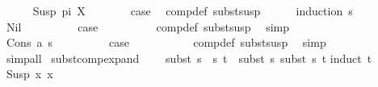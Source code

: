 \begin{isabellebody}
\ \ \ \ \isamarkupfalse%
\ {\isacharparenleft}{\kern0pt}Susp\ pi\ X{\isacharparenright}{\kern0pt}\isanewline
\ \ \ \ \isamarkupfalse%
\ \isamarkupfalse%
\ {\isacharquery}{\kern0pt}case\ \isamarkupfalse%
\ comp{\isacharunderscore}{\kern0pt}def\ subst{\isacharunderscore}{\kern0pt}susp\isanewline
\ \ \ \ \isamarkupfalse%
\ {\isacharparenleft}{\kern0pt}induction\ s{\isacharparenright}{\kern0pt}\isanewline
\ \ \ \ \ \ \isamarkupfalse%
\ Nil\isanewline
\ \ \ \ \ \ \isamarkupfalse%
\ \isamarkupfalse%
\ {\isacharquery}{\kern0pt}case\isanewline
\ \ \ \ \ \ \ \ \isamarkupfalse%
\ comp{\isacharunderscore}{\kern0pt}def\ subst{\isacharunderscore}{\kern0pt}susp\ \isamarkupfalse%
\ simp\isanewline
\ \ \ \ \isamarkupfalse%
\isanewline
\ \ \ \ \ \ \isamarkupfalse%
\ {\isacharparenleft}{\kern0pt}Cons\ a\ s{\isacharparenright}{\kern0pt}\isanewline
\ \ \ \ \ \ \isamarkupfalse%
\ \isamarkupfalse%
\ {\isacharquery}{\kern0pt}case\ \isanewline
\ \ \ \ \ \ \ \ \isamarkupfalse%
\ comp{\isacharunderscore}{\kern0pt}def\ subst{\isacharunderscore}{\kern0pt}susp\ \isamarkupfalse%
\ simp\isanewline
\ \ \ \ \isamarkupfalse%
\isanewline
\ \ \isamarkupfalse%
\ {\isacharparenleft}{\kern0pt}simp{\isacharunderscore}{\kern0pt}all{\isacharparenright}{\kern0pt}\isanewline
{}\isamarkupfalse%
%
\endisatagproof
{\isafoldproof}%
%
\isadelimproof
\isanewline
%
\endisadelimproof
\isanewline
{}\isamarkupfalse%
\ subst{\isacharunderscore}{\kern0pt}comp{\isacharunderscore}{\kern0pt}expand{\isacharcolon}{\kern0pt}\ \isanewline
\ \ \ {\isachardoublequoteopen}subst\ {\isacharparenleft}{\kern0pt}s{}\ {\isasymbullet}\ s{}{\isacharparenright}{\kern0pt}\ t\ {\isacharequal}{\kern0pt}\ subst\ s{}\ {\isacharparenleft}{\kern0pt}subst\ s{}\ t{\isacharparenright}{\kern0pt}{\isachardoublequoteclose}\isanewline
%
\isadelimproof
%
\endisadelimproof
%
\isatagproof
{}\isamarkupfalse%
{\isacharparenleft}{\kern0pt}induct\ t{\isacharparenright}{\kern0pt}\isanewline
\ \ \isamarkupfalse%
\ {\isacharparenleft}{\kern0pt}Susp\ x{}\ x{}{\isacharparenright}{\kern0pt}\isanewline
\ \ \isamarkupfalse%

\end{isabellebody}
